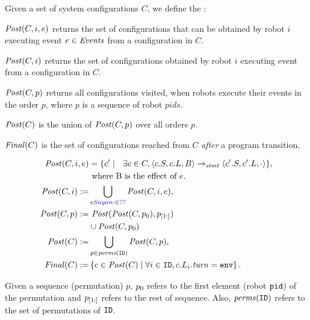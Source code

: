  Given a set of system configurations $C$, we define the :
 \begin{inparaenum}[(i)]
     \item $\mathit{Post}(C,i,e)$ returns the set of configurations that can be obtained by robot $i$ executing event $e \in \mathit{Events}$ from a configuration in $C$.
     \item$\mathit{Post}(C,i)$ returns the set of configurations obtained by robot $i$ executing  event from a configuration in $C$.
     \item$\mathit{Post}(C,p)$ returns all configurations visited, when robots execute their events in the order $p$, where $p$ is a sequence of robot $\mathit{pids}$.
     \item $\mathit{Post}(C)$ is the union of $\mathit{Post}(C,p)$ over all orders $p$.
     \item$\mathit{Final}(C)$ is the set of configurations reached from $C$ \emph{after} a program transition.
 \end{inparaenum}
\vspace{1mm}
\begin{mdframed}
\footnotesize
\begin{align*}
    \mathit{Post} (C,i,e) &= \{ c^\prime\mid \ \ \exists c \in C, \left\langle c.S, c.L, B \right\rangle \rightarrow_\mathit{stmt} \left\langle c^\prime.S, c^\prime.L, \cdot \right\rangle \},\\ &\mbox{ where B is the effect of }e.\\
\mathit{Post}(C,i) :=& \bigcup_{e\textcolor{blue}{Sayan: \in??}} \mathit{Post}(C,i,e),\\
\mathit{Post}(C,p) := & \ \mathit{Post}(\mathit{Post}(C,p_0), p_{[1:]})\\ & \cup \mathit{Post}(C,p_0)\\
\mathit{Post}(C) :=& \bigcup_{p\in \mathit{perms}(\texttt{ID})} \mathit{Post}(C,p), \\
\mathit{Final}(C) :=& \left\{ c\in \mathit{Post}(C)\mid \forall i \in \texttt{ID}, c.L_i.\mathit{turn} = \mathtt{env} \right\}.
\end{align*}
\end{mdframed}
Given a sequence (permutation) $p$, $p_0$ refers to the first element (robot $\texttt{pid}$) of the permutation and $p_{[1:]}$ refers to the rest of sequence. Also, $\mathit{perms}(\texttt{ID})$ refers to the set of permutations of $\texttt{ID}$.

